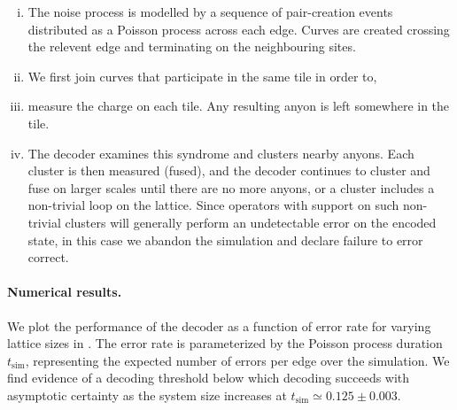 \documentclass[aps, prl, letterpaper, twocolumn, superscriptaddress, notitlepage, 10pt]{revtex4-1}
\begin{document}
\begin{enumerate}[i)]
	\item The noise process is modelled by a sequence of pair-creation events distributed as a Poisson process across each edge. Curves are created crossing the relevent edge and terminating on the neighbouring sites.
	\item We first join curves that participate in the same tile in order to, 
	\item measure the charge on each tile. Any resulting anyon is left somewhere in the tile.
	\item The decoder examines this syndrome and clusters nearby anyons. Each cluster is then measured (fused), and the decoder continues to cluster and fuse on larger scales until there are no more anyons, or a cluster includes a non-trivial loop on the lattice. Since operators with support on such non-trivial clusters will generally perform an undetectable error on the encoded state, in this case we abandon the simulation and declare failure to error correct.
\end{enumerate}

\paragraph{Numerical results.}

	We plot the performance of the decoder as a function of error rate for varying lattice sizes in . The error rate is parameterized by the Poisson process duration $t_{\mathrm{sim}}$, representing the expected number of errors per edge over the simulation. We find evidence of a decoding threshold below which decoding succeeds with asymptotic certainty as the system size increases at $t_{\mathrm{sim}}\simeq 0.125 \pm 0.003$.
\end{document}
